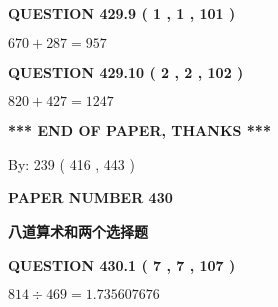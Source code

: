 \documentclass{ctexart}
\begin{document}
 
  
\vspace{0.2in}
  
{\textbf{\Large{QUESTION
429.9 
 ( 1 , 1 , 101 )
}}}
  
  
 
 

$ %
670 +  %
287=   %
957$
 
 
  
\vspace{0.2in}
  
{\textbf{\Large{QUESTION
429.10 
 ( 2 , 2 , 102 )
}}}
  
  
 
 

$ %
820 +  %
427=   %
1247$
 
 
   
   
 \vspace{0.2in}
 
   
   
   
   
\vspace{1.0in} 
{\textbf{\large{ *** END OF PAPER, THANKS *** }}} 
   
   
\hspace{1.0in} By: 
 239 ( 416 ,  443 )
   
   
   
   
\newpage 
\setcounter{page}{ 
   430001 } 
   
   
   
   
 {\textbf{ \Large{ PAPER NUMBER  430  }}}
   
   
\vspace{0.2in}
   
   
   
   
   
   
 \vspace{0.2in}
{\LARGE {\textbf{ 八道算术和两个选择题}}}
   
   
  
\vspace{0.2in}
  
{\textbf{\Large{QUESTION
430.1 
 ( 7 , 7 , 107 )
}}}
  
  
 
 

$ %
814 \div  %
469=   %
1.735607676$
 
 
  
\vspace{0.2in}
  
\end{document}
